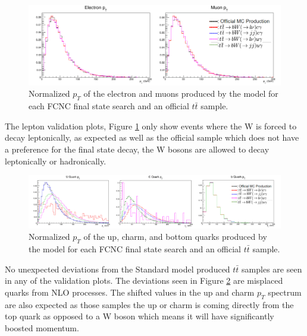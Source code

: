 \begin{figure}[h!]
	\centering
	\includegraphics[width=\columnwidth]{../ThesisImages/FCNCValidation/lepton.png}
	\caption{Normalized $p_T$ of the electron and muons produced by the model for each FCNC final state search and an official $t\bar{t}$ sample.
	}
	\label{fig:LepVal}
\end{figure} 

The lepton validation plots, Figure \ref{fig:LepVal} only show events where the W is forced to decay leptonically, as expected as well as the official sample which does not have a preference for the final state decay, the W bosons are allowed to decay leptonically or hadronically.  
\begin{figure}[h!]
	\centering
	\includegraphics[width=\columnwidth]{../ThesisImages/FCNCValidation/quarks.png}
	\caption{Normalized $p_T$ of the up, charm, and bottom quarks produced by the model for each FCNC final state search and an official $t\bar{t}$ sample.
	}
	\label{fig:QuarkVal}
\end{figure}
No unexpected deviations from the Standard model produced $t\bar{t}$ samples are seen in any of the validation plots.  The deviations seen in Figure \ref{fig:QuarkVal} are misplaced quarks from NLO processes.  The shifted values in the up and charm $p_T$ spectrum are also expected as those samples the up or charm is coming directly from the top quark as opposed to a W boson which means it will have significantly boosted momentum. 

